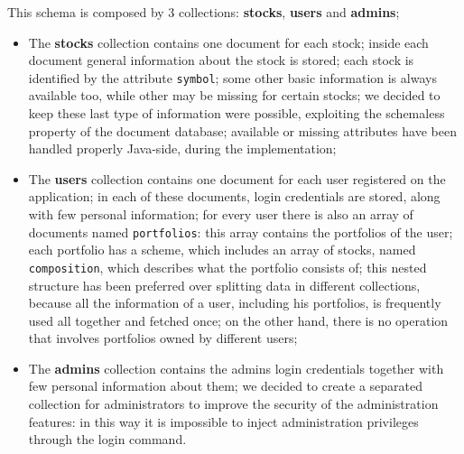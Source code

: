 \noindent
This schema is composed by 3 collections: \textbf{stocks}, \textbf{users} and \textbf{admins};
\begin{itemize}
    \item The \textbf{stocks} collection contains one document for each stock;
    inside each document general information about the stock is stored; each
    stock is identified by the attribute \texttt{symbol}; some other basic
    information is always available too, while other may be missing for certain
    stocks; we decided to keep these last type of information were possible,
    exploiting the schemaless property of the document database; available or
    missing attributes have been handled properly Java-side, during the
    implementation;
    \item The \textbf{users} collection contains one document for each user
    registered on the application; in each of these documents, login credentials
    are stored, along with few personal information; for every user there is
    also an array of documents named \texttt{portfolios}: this array contains
    the portfolios of the user; each portfolio has a scheme, which includes an
    array of stocks, named \texttt{composition}, which describes what the
    portfolio consists of; this nested structure has been preferred over
    splitting data in different collections, because all the information of a
    user, including his portfolios, is frequently used all together and fetched
    once; on the other hand, there is no operation that involves portfolios
    owned by different users;
    \item The \textbf{admins} collection contains the admins login credentials
    together with few personal information about them; we decided to create a
    separated collection for administrators to improve the security of the
    administration features: in this way it is impossible to inject
    administration privileges through the login command.
\end{itemize}
